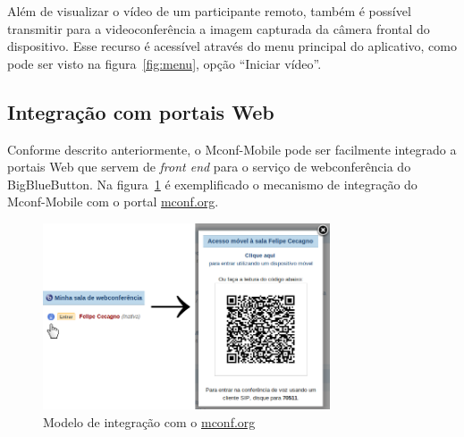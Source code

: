 \documentclass{acm_proc_article-sp}
\begin{document}
Além de visualizar o vídeo de um participante remoto, também é possível transmitir para a videoconferência a imagem capturada da câmera frontal do dispositivo. Esse recurso é acessível através do menu principal do aplicativo, como pode ser visto na figura~\ref{fig:menu}, opção ``Iniciar vídeo''.




\subsection{Integração com portais Web}\label{subsec:mconf-web}

Conforme descrito anteriormente, o Mconf-Mobile pode ser facilmente integrado a portais Web que servem de \emph{front end} para o serviço de webconferência do BigBlueButton. Na figura~\ref{fig:mconf-integration} é exemplificado o mecanismo de integração do Mconf-Mobile com o portal \url{mconf.org}.

\begin{figure}[htp]
\centering
\includegraphics[width=85mm]{mconf_integration.png}
\caption{Modelo de integração com o \url{mconf.org}}\label{fig:mconf-integration}
\end{figure}
\end{document}
